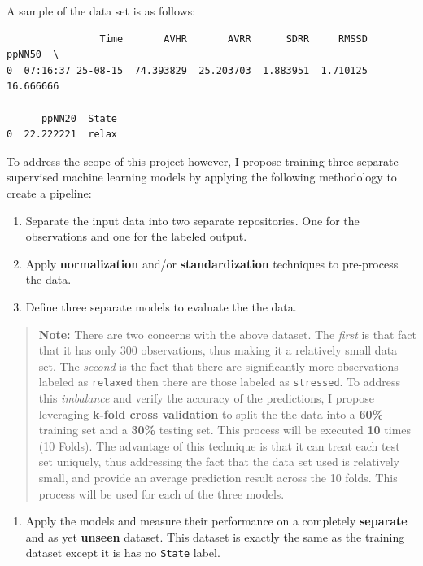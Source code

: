 \documentclass{scrreprt}
\begin{document}
A sample of the data set is as follows:

    

    

    
    
    \begin{verbatim}
                Time       AVHR       AVRR      SDRR     RMSSD     ppNN50  \
0  07:16:37 25-08-15  74.393829  25.203703  1.883951  1.710125  16.666666   

      ppNN20  State  
0  22.222221  relax  
    \end{verbatim}

    

    To address the scope of this project however, I propose training three
separate supervised machine learning models by applying the following
methodology to create a pipeline:

\begin{enumerate}
\def\labelenumi{\arabic{enumi}.}
\itemsep1pt\parskip0pt
\item
  Separate the input data into two separate repositories. One for the
  observations and one for the labeled output.
\item
  Apply \textbf{normalization} and/or \textbf{standardization}
  techniques to pre-process the data.
\item
  Define three separate models to evaluate the the data.
\end{enumerate}

\begin{quote}
\textbf{Note:} There are two concerns with the above dataset. The
\emph{first} is that fact that it has only 300 observations, thus making
it a relatively small data set. The \emph{second} is the fact that there
are significantly more observations labeled as \texttt{relaxed} then
there are those labeled as \texttt{stressed}. To address this
\emph{imbalance} and verify the accuracy of the predictions, I propose
leveraging \textbf{k-fold cross validation} to split the the data into a
\textbf{60\%} training set and a \textbf{30\%} testing set. This process
will be executed \textbf{10} times (10 Folds). The advantage of this
technique is that it can treat each test set uniquely, thus addressing
the fact that the data set used is relatively small, and provide an
average prediction result across the 10 folds. This process will be used
for each of the three models.
\end{quote}

\begin{enumerate}
\def\labelenumi{\arabic{enumi}.}
\setcounter{enumi}{3}
\itemsep1pt\parskip0pt
\item
  Apply the models and measure their performance on a completely
  \textbf{separate} and as yet \textbf{unseen} dataset. This dataset is
  exactly the same as the training dataset except it is has no
  \texttt{State} label.
\end{enumerate}
\end{document}
